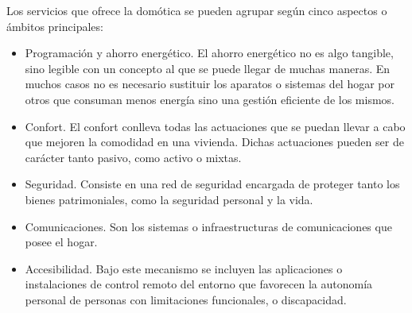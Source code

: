 Los servicios que ofrece la domótica se pueden agrupar según cinco aspectos o ámbitos principales\citep{2}:

\begin{itemize}
	\item Programación y ahorro energético. El ahorro energético no es algo tangible, sino legible con un concepto al que se puede llegar de muchas maneras. En muchos casos no es necesario sustituir los aparatos o sistemas del hogar por otros que consuman menos energía sino una gestión eficiente de los mismos.
	\item Confort. El confort conlleva todas las actuaciones que se puedan llevar a cabo que mejoren la comodidad en una vivienda. Dichas actuaciones pueden ser de carácter tanto pasivo, como activo o mixtas.
	\item Seguridad. Consiste en una red de seguridad encargada de proteger tanto los bienes patrimoniales, como la seguridad personal y la vida.
	\item Comunicaciones. Son los sistemas o infraestructuras de comunicaciones que posee el hogar.
	\item Accesibilidad. Bajo este mecanismo se incluyen las aplicaciones o instalaciones de control remoto del entorno que favorecen la autonomía personal de personas con limitaciones funcionales, o discapacidad.
\end{itemize}

